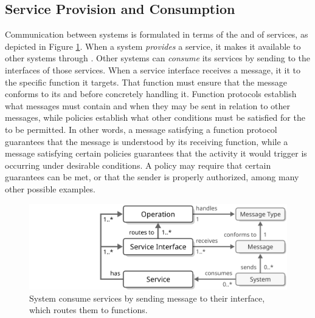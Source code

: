  \vspace*{-3mm}

\subsection{Service Provision and Consumption}

Communication between systems is formulated in terms of the  and  of services, as depicted in Figure \ref{fig:service-consumption}.
When a system \textit{provides} a service, it makes it available to other systems through .
Other systems can \textit{consume} its services by sending  to the interfaces of those services.
When a service interface receives a message, it  it to the specific function it targets.
That function must ensure that the message conforms to its  and  before concretely handling it.
Function protocols establish what messages must contain and when they may be sent in relation to other messages, while policies establish what other conditions must be satisfied for the  to be permitted.
In other words, a message satisfying a function protocol guarantees that the message is understood by its receiving function, while a message satisfying certain policies guarantees that the activity it would trigger is occurring under desirable conditions.
A policy may require that certain  guarantees can be met, or that the sender is properly authorized, among many other possible examples.

\begin{figure}[ht!]
  \centering
  \includegraphics[scale=0.9]{figures/service-consumption}
  \caption{
    System consume services by sending message to their interface, which routes them to functions.
  }
  \label{fig:service-consumption}
\end{figure}

